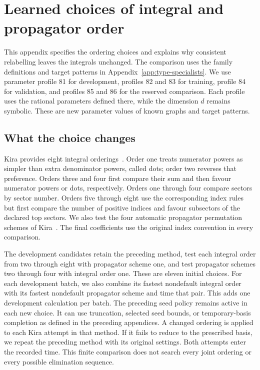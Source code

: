 \section{Learned choices of integral and propagator order}
\label{app:ordering-policy}
This appendix specifies the ordering choices and explains why consistent relabelling leaves the integrals unchanged. The comparison uses the family definitions and target patterns in Appendix~\ref{app:type-specialists}. We use parameter profile 81 for
development, profiles 82 and 83 for training, profile 84 for validation,
and profiles 85 and 86 for the reserved comparison. Each profile uses
the rational parameters defined there, while the dimension $d$ remains
symbolic. These are new parameter values of known graphs and target
patterns.

\subsection{What the choice changes}
Kira provides eight integral orderings~\cite{Kira12}. Order one treats
numerator powers as simpler than extra denominator powers, called dots;
order two reverses that preference. Orders three and four first compare
their sum and then favour numerator powers or dots, respectively.
Orders one through four compare sectors by sector number. Orders five
through eight use the corresponding index rules but first compare the
number of positive indices and favour subsectors of the declared top
sectors. We also test the four automatic propagator permutation schemes
of Kira~\cite{Kira3}. The final coefficients use the original index
convention in every comparison.

The development candidates retain the preceding method, test each integral
order from two through eight with propagator scheme one, and test
propagator schemes two through four with integral order one. These are
eleven initial choices. For each development batch, we also combine its
fastest nondefault integral order with its fastest nondefault propagator
scheme and time that pair. This adds one development calculation per
batch. The preceding seed policy remains active in each
new choice. It can use truncation, selected seed bounds, or temporary-basis
completion as defined in the preceding appendices. A changed ordering is
applied to each Kira attempt in that method. If it fails to reduce to the
prescribed basis, we repeat the preceding method with its original settings.
Both attempts enter the recorded time. This finite comparison does not
search every joint ordering or every possible elimination sequence.

